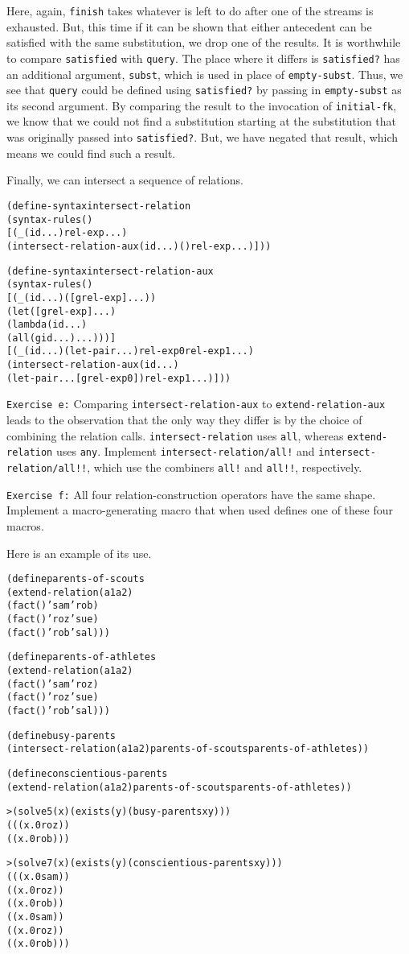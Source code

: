 Here, again, \texttt{finish} takes whatever is left to do after one of
the streams is exhausted.  But, this time if it can be shown that
either antecedent can be satisfied with the same substitution, we drop
one of the results.  It is worthwhile to compare \texttt{satisfied}
with \texttt{query}.  The place where it differs is
\texttt{satisfied?} has an additional argument, \texttt{subst}, which
is used in place of \texttt{empty-subst}.  Thus, we see that
\texttt{query} could be defined using \texttt{satisfied?} by passing
in \texttt{empty-subst} as its second argument.  By comparing the
result to the invocation of \texttt{initial-fk}, we know that we could not
find a substitution starting at the substitution that was originally
passed into \texttt{satisfied?}.  But, we have negated that result,
which means we could find such a result.

Finally, we can intersect a sequence of relations.
\begin{alltt}
(define-syntax intersect-relation
  (syntax-rules ()
    [(_ (id ...) rel-exp ...)
     (intersect-relation-aux (id ...) () rel-exp ...)]))

(define-syntax intersect-relation-aux
  (syntax-rules ()
    [(_ (id ...) ([g rel-exp] ...))
     (let ([g rel-exp] ...)
       (lambda (id ...)
         (all (g id ...) ...)))]
    [(_ (id ...) (let-pair ...) rel-exp0 rel-exp1 ...)
     (intersect-relation-aux (id ...)
       (let-pair ... [g rel-exp0]) rel-exp1 ...)]))
\end{alltt}

\texttt{Exercise e:} Comparing \texttt{intersect-relation-aux} to
\texttt{extend-relation-aux} leads to the observation that the only
way they differ is by the choice of combining the relation calls.
\texttt{intersect-relation} uses \texttt{all}, whereas
\texttt{extend-relation} uses \texttt{any}.  Implement
\texttt{intersect-relation/all!} and
\texttt{intersect-relation/all!!}, which use the combiners
\texttt{all!} and \texttt{all!!}, respectively.\endofexercise{}

\texttt{Exercise f:} All four relation-construction operators have the
same shape.  Implement a macro-generating macro that when used defines
one of these four macros.

Here is an example of its use.

\begin{alltt}
(define parents-of-scouts
  (extend-relation (a1 a2)
    (fact () 'sam 'rob)
    (fact () 'roz 'sue)
    (fact () 'rob 'sal)))

(define parents-of-athletes
  (extend-relation (a1 a2)
    (fact () 'sam 'roz)
    (fact () 'roz 'sue)
    (fact () 'rob 'sal)))

(define busy-parents
  (intersect-relation (a1 a2) parents-of-scouts parents-of-athletes))

(define conscientious-parents
  (extend-relation (a1 a2) parents-of-scouts parents-of-athletes))

> (solve 5 (x) (exists (y) (busy-parents x y)))
(((x.0 roz))
 ((x.0 rob)))

> (solve 7 (x) (exists (y) (conscientious-parents x y)))
(((x.0 sam))
 ((x.0 roz))
 ((x.0 rob))
 ((x.0 sam))
 ((x.0 roz))
 ((x.0 rob)))
\end{alltt}

